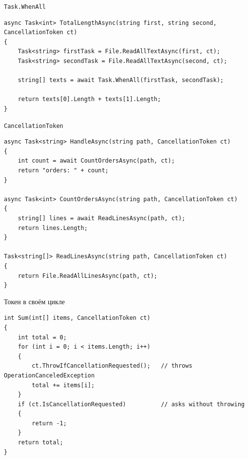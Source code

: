 \documentclass[aspectratio=169,10pt,t]{beamer}
\newcommand{\codesm}{\ttfamily\fontsize{7.6}{9.0}\selectfont}
\begin{document}
\begin{frame}[fragile]{\texttt{Task.WhenAll}}
  \slidetop

\begin{lstlisting}[style=csharp,basicstyle=\codesm]
async Task<int> TotalLengthAsync(string first, string second, CancellationToken ct)
{
    Task<string> firstTask = File.ReadAllTextAsync(first, ct);
    Task<string> secondTask = File.ReadAllTextAsync(second, ct);

    string[] texts = await Task.WhenAll(firstTask, secondTask);

    return texts[0].Length + texts[1].Length;
}
\end{lstlisting}

  \slidegap
\end{frame}

\begin{frame}[fragile]{\texttt{CancellationToken}}
  \vspace{0.3em}

\begin{lstlisting}[style=csharp,basicstyle=\ttfamily\fontsize{6.6}{7.6}\selectfont]
async Task<string> HandleAsync(string path, CancellationToken ct)
{
    int count = await CountOrdersAsync(path, ct);
    return "orders: " + count;
}

async Task<int> CountOrdersAsync(string path, CancellationToken ct)
{
    string[] lines = await ReadLinesAsync(path, ct);
    return lines.Length;
}

Task<string[]> ReadLinesAsync(string path, CancellationToken ct)
{
    return File.ReadAllLinesAsync(path, ct);
}
\end{lstlisting}

  \vspace{-0.3em}
\end{frame}

\begin{frame}[fragile]{Токен в своём цикле}
  \slidetop

\begin{lstlisting}[style=csharp,basicstyle=\ttfamily\fontsize{6.8}{7.9}\selectfont]
int Sum(int[] items, CancellationToken ct)
{
    int total = 0;
    for (int i = 0; i < items.Length; i++)
    {
        ct.ThrowIfCancellationRequested();   // throws OperationCanceledException
        total += items[i];
    }
    if (ct.IsCancellationRequested)          // asks without throwing
    {
        return -1;
    }
    return total;
}
\end{lstlisting}

  \vspace{0.2em}
\end{frame}
\end{document}
